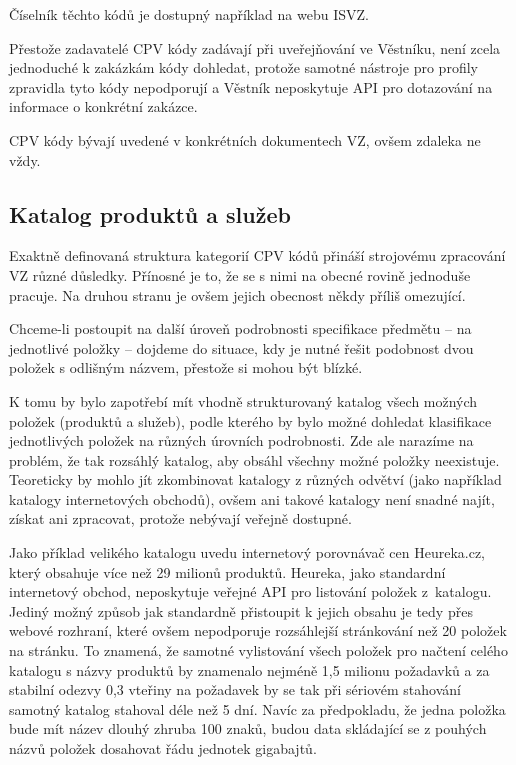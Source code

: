 \documentclass[thesis=M,czech]{FITthesis}[2019/12/23]
\begin{document}
Číselník těchto kódů je dostupný například na webu ISVZ\cite{isvz}.

Přestože zadavatelé CPV kódy zadávají při uveřejňování ve Věstníku, není zcela jednoduché k zakázkám kódy dohledat, protože samotné nástroje pro profily zpravidla tyto kódy nepodporují a Věstník neposkytuje API pro dotazování na informace o konkrétní zakázce.

CPV kódy bývají uvedené v konkrétních dokumentech VZ, ovšem zdaleka ne vždy.
\newpage
\subsection{Katalog produktů a služeb}
\label{sec:product_catalog}

Exaktně definovaná struktura kategorií CPV kódů přináší strojovému zpracování VZ různé důsledky. Přínosné je to, že se s nimi na obecné rovině jednoduše pracuje. Na druhou stranu je ovšem jejich obecnost někdy příliš omezující.

Chceme-li postoupit na další úroveň podrobnosti specifikace předmětu -- na jednotlivé položky -- dojdeme do situace, kdy je nutné řešit podobnost dvou položek s odlišným názvem, přestože si mohou být blízké.

K tomu by bylo zapotřebí mít vhodně strukturovaný katalog všech možných položek (produktů a služeb), podle kterého by bylo možné dohledat klasifikace jednotlivých položek na různých úrovních podrobnosti. Zde ale narazíme na problém, že tak rozsáhlý katalog, aby obsáhl všechny možné položky neexistuje. Teoreticky by mohlo jít zkombinovat katalogy z různých odvětví (jako například katalogy internetových obchodů), ovšem ani takové katalogy není snadné najít, získat ani zpracovat, protože nebývají veřejně dostupné.

Jako příklad velikého katalogu uvedu internetový porovnávač cen Heureka.cz, který obsahuje více než 29 milionů produktů\cite{heureka}. Heureka, jako standardní internetový obchod, neposkytuje veřejné API pro listování položek z~katalogu. Jediný možný způsob jak standardně přistoupit k jejich obsahu je tedy přes webové rozhraní, které ovšem nepodporuje rozsáhlejší stránkování než 20 položek na stránku. To znamená, že samotné vylistování všech položek pro načtení celého katalogu s názvy produktů by znamenalo nejméně 1,5 milionu požadavků a za stabilní odezvy 0,3 vteřiny na požadavek by se tak při sériovém stahování samotný katalog stahoval déle než 5 dní. Navíc za předpokladu, že jedna položka bude mít název dlouhý zhruba 100 znaků, budou data skládající se z pouhých názvů položek dosahovat řádu jednotek gigabajtů.
\end{document}
